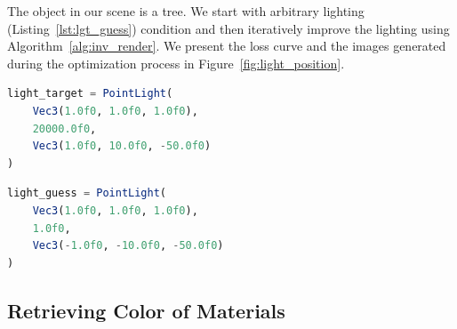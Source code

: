 \documentclass{juliacon}
\begin{document}
The object in our scene is a tree. We start with arbitrary lighting (Listing~\ref{lst:lgt_guess}) condition and then iteratively improve the lighting using Algorithm~\ref{alg:inv_render}. We present the loss curve and the images generated during the optimization process in Figure~\ref{fig:light_position}.

\noindent
\begin{minipage}{\linewidth}
\begin{lstlisting}[caption = {Target Lighting Conditions},
                   label = {lst:lgt_target},
                   captionpos = b,
                   language = Julia]
light_target = PointLight(
    Vec3(1.0f0, 1.0f0, 1.0f0),
    20000.0f0,
    Vec3(1.0f0, 10.0f0, -50.0f0)
)
\end{lstlisting}
\end{minipage}

\noindent
\begin{minipage}{\linewidth}
\begin{lstlisting}[caption = {Initial Guess of Lighting Conditions},
                   label = {lst:lgt_guess},
                   captionpos = b,
                   language = Julia]
light_guess = PointLight(
    Vec3(1.0f0, 1.0f0, 1.0f0),
    1.0f0,
    Vec3(-1.0f0, -10.0f0, -50.0f0)
)
\end{lstlisting}
\end{minipage}

\subsection{Retrieving Color of Materials}
\label{sec:mat_color}
\end{document}
